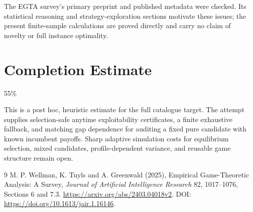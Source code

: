 \documentclass[11pt]{article}
\theoremstyle{remark}\newtheorem{remark}[theorem]{Remark}
\begin{document}
The EGTA survey's primary preprint and published metadata were checked. Its statistical reasoning and strategy-exploration sections motivate these issues; the present finite-sample calculations are proved directly and carry no claim of novelty or full instance optimality.

\section{Completion Estimate}
55\%

This is a post hoc, heuristic estimate for the full catalogue target.
The attempt supplies selection-safe anytime exploitability certificates, a finite exhaustive fallback, and matching gap dependence for auditing a fixed pure candidate with known incumbent payoffs. Sharp adaptive simulation costs for equilibrium selection, mixed candidates, profile-dependent variance, and reusable game structure remain open.

\begin{thebibliography}{9}
 M. P. Wellman, K. Tuyls and A. Greenwald (2025), Empirical Game-Theoretic Analysis: A Survey, \emph{Journal of Artificial Intelligence Research} 82, 1017--1076, Sections 6 and 7.3. \url{https://arxiv.org/abs/2403.04018v2}. DOI: \url{https://doi.org/10.1613/jair.1.16146}.
\end{thebibliography}
\end{document}
